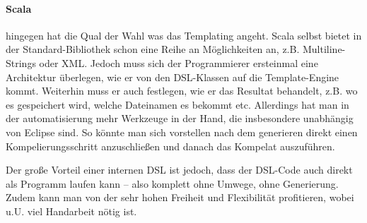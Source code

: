 \paragraph{Scala} hingegen hat die Qual der Wahl was das Templating angeht.
Scala selbst bietet in der Standard-Bibliothek schon
eine Reihe an Möglichkeiten an,
z.B. Multiline-Strings oder XML. Jedoch muss sich der Programmierer ersteinmal
eine Architektur überlegen, wie er von den DSL-Klassen auf die Template-Engine
kommt. Weiterhin muss er auch festlegen, wie er das Resultat behandelt,
z.B. wo es gespeichert wird, welche Dateinamen es bekommt etc.
Allerdings hat man in der automatisierung mehr Werkzeuge in der Hand,
die insbesondere unabhängig von Eclipse sind. So könnte man sich vorstellen
nach dem generieren direkt einen Kompelierungsschritt anzuschließen und
danach das Kompelat auszuführen.

Der große Vorteil einer internen DSL ist jedoch, dass der DSL-Code auch
direkt als Programm laufen kann -- also komplett ohne Umwege, ohne Generierung.
Zudem kann man von der sehr hohen Freiheit und Flexibilität profitieren,
wobei u.U. viel Handarbeit nötig ist.

